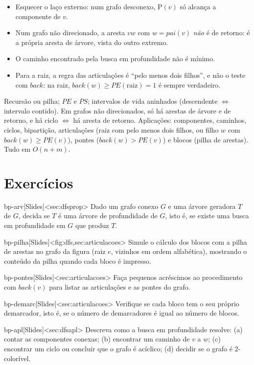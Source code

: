 \begin{cuidado}
\begin{itemize}
  \item Esquecer o laço externo: num grafo desconexo, \textsc{P}$(v)$ só alcança a componente de $v$.
  \item Num grafo não direcionado, a aresta $vw$ com $w=pai(v)$ \emph{não} é de retorno: é a própria aresta de árvore, vista do outro extremo.
  \item O caminho encontrado pela busca em profundidade não é mínimo.
  \item Para a raiz, a regra das articulações é ``pelo menos dois filhos'', e não o teste com $back$: na raiz, $back(w)\ge PE(\text{raiz})=1$ é sempre verdadeiro.
\end{itemize}
\end{cuidado}

\begin{chave}
Recursão ou pilha; $PE$ e $PS$; intervalos de vida aninhados (descendente $\iff$ intervalo contido). Em grafos não direcionados, só há arestas de árvore e de retorno, e há ciclo $\iff$ há aresta de retorno. Aplicações: componentes, caminhos, ciclos, bipartição, articulações (raiz com pelo menos dois filhos, ou filho $w$ com $back(w)\ge PE(v)$), pontes ($back(w)>PE(v)$) e blocos (pilha de arestas). Tudo em $O(n+m)$.
\end{chave}

\section{Exercícios}
\excurso
\begin{exercicio}{bp-arv}[Slides]<sec:dfsprop>
Dado um grafo conexo $G$ e uma árvore geradora $T$ de $G$, decida se $T$ é uma árvore de profundidade de $G$, isto é, se existe uma busca em profundidade em $G$ que produz $T$.
\end{exercicio}
\begin{exercicio}{bp-pilha}[Slides]<fig:dfs,sec:articulacoes>
Simule o cálculo dos blocos com a pilha de arestas no grafo da figura (raiz $e$, vizinhos em ordem alfabética), mostrando o conteúdo da pilha quando cada bloco é impresso.
\end{exercicio}
\begin{exercicio}{bp-pontes}[Slides]<sec:articulacoes>
Faça pequenos acréscimos ao procedimento com $back(v)$ para listar as articulações e as pontes do grafo.
\end{exercicio}
\begin{exercicio}{bp-demarc}[Slides]<sec:articulacoes>
Verifique se cada bloco tem o seu próprio demarcador, isto é, se o número de demarcadores é igual ao número de blocos.
\end{exercicio}
\begin{exercicio}{bp-apl}[Slides]<sec:dfsapl>
Descreva como a busca em profundidade resolve: (a) contar as componentes conexas; (b) encontrar um caminho de $v$ a $w$; (c) encontrar um ciclo ou concluir que o grafo é acíclico; (d) decidir se o grafo é 2-colorível.
\end{exercicio}

